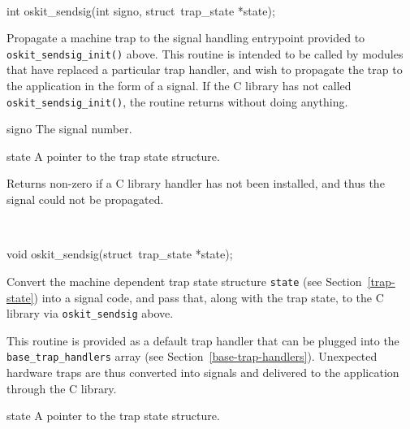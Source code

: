 \begin{apisyn}
	\\

	\funcproto int oskit_sendsig(int signo, struct~trap_state *state);
\end{apisyn}
\begin{apidesc}
	Propagate a machine trap to the signal handling entrypoint provided
	to {\tt oskit_sendsig_init()} above. This routine is intended to be
	called by modules that have replaced a particular trap handler, and
	wish to propagate the trap to the application in the form of a
	signal. If the C library has not called {\tt oskit_sendsig_init()},
	the routine returns without doing anything.
\end{apidesc}
\begin{apiparm}
	\item[signo]
		The signal number.
	\item[state]
		A pointer to the trap state structure.
\end{apiparm}
\begin{apiret}
	Returns non-zero if a C library handler has not been installed, and
	thus the signal could not be propagated.
\end{apiret}

\begin{apisyn}
	\\

	\funcproto void oskit_sendsig(struct~trap_state *state);
\end{apisyn}
\begin{apidesc}
	Convert the machine dependent trap state structure {\tt state} (see
	Section~\ref{trap-state}) into a signal code, and pass that, along
	with the trap state, to the C library via {\tt oskit_sendsig} above.

	This routine is provided as a default trap handler that can be
	plugged into the {\tt base_trap_handlers} array (see
	Section~\ref{base-trap-handlers}). Unexpected hardware traps are thus
	converted into signals and delivered to the application through
	the C library.
\end{apidesc}
\begin{apiparm}
	\item[state]
		A pointer to the trap state structure.
\end{apiparm}
